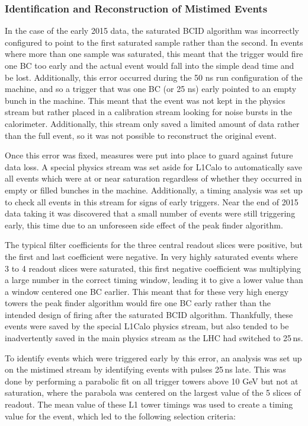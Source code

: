 \subsubsection{Identification and Reconstruction of Mistimed Events}

In the case of the early 2015 data, the saturated BCID algorithm was incorrectly configured to point to the first saturated sample rather than the second.  In events where more than one sample was saturated, this meant that the trigger would fire one BC too early and the actual event would fall into the simple dead time and be lost.  Additionally, this error occurred during the 50 ns run configuration of the machine, and so a trigger that was one BC (or 25 ns) early pointed to an empty bunch in the machine.  This meant that the event was not kept in the physics stream but rather placed in a calibration stream looking for noise bursts in the calorimeter.  Additionally, this stream only saved a limited amount of data rather than the full event, so it was not possible to reconstruct the original event.

Once this error was fixed, measures were put into place to guard against future data loss.  A special physics stream was set aside for L1Calo to automatically save all events which were at or near saturation regardless of whether they occurred in empty or filled bunches in the machine.  Additionally, a timing analysis was set up to check all events in this stream for signs of early triggers.  Near the end of 2015 data taking it was discovered that a small number of events were still triggering early, this time due to an unforeseen side effect of the peak finder algorithm.

The typical filter coefficients for the three central readout slices were positive, but the first and last coefficient were negative.  In very highly saturated events where 3 to 4 readout slices were saturated, this first negative coefficient was multiplying a large number in the correct timing window, leading it to give a lower value than a window centered one BC earlier.  This meant that for these very high energy towers the peak finder algorithm would fire one BC early rather than the intended design of firing after the saturated BCID algorithm.  Thankfully, these events were saved by the special L1Calo physics stream, but also tended to be inadvertently saved in the main physics stream as the LHC had switched to 25\,ns.

To identify events which were triggered early by this error, an analysis was set up on the mistimed stream by identifying events with pulses 25\,ns late.  This was done by performing a parabolic fit on all trigger towers above 10 GeV but not at saturation, where the parabola was centered on the largest value of the 5 slices of readout.  The mean value of these L1 tower timings was used to create a timing value for the event, which led to the following selection criteria:

